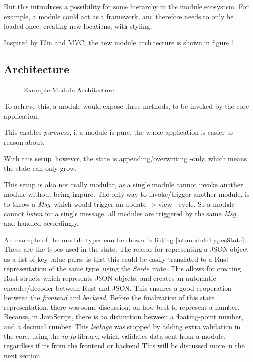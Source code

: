 
But this introduces a possibility for some hierarchy in the module ecosystem.
For example, a module could act as a framework, and therefore needs to only be
loaded once, creating new locations, with styling.

Inspired by Elm and MVC, the new module architecture is shown in figure
\ref{fig:moduleArchitecture}

\subsection{Architecture}
\begin{figure}
  \centering
  
  \caption{Example Module Architecture}
  \label{fig:moduleArchitecture}
\end{figure}

To achieve this, a module would expose three methods, to be invoked by the core
application.

This enables \textit{pureness}, if a module is pure, the whole application is
easier to reason about.

With this setup, however, the state is appending/overwriting -only, which means
the state can only grow.

This setup is also not really modular, as a single module cannot invoke another
module without being impure. The only way to invoke/trigger another module, is
to throw a \textit{Msg}, which would trigger an update -> view - cycle. So
a module cannot \textit{listen} for a single message, all modules are triggered
by the same \textit{Msg}, and handled accordingly.

An example of the module types can be shown in listing
\ref{lst:moduleTypesState}. These are the types used in the state. The reason
for representing a JSON object as a list of key-value pairs, is that this could
be easily translated to a Rust representation of the same type, using the
\textit{Serde} crate. This allows for creating Rust structs which represents
JSON objects, and creates an automatic encoder/decoder between Rust and JSON.
This ensures a good cooperation between the \textit{frontend} and
\textit{backend}.
Before the finalization of this state representation, there was some
discussion, on how best to represent a number. Because, in JavaScript, there is
no distinction between a floating-point number, and a decimal number. This
\textit{leakage} was stopped by adding extra validation in the core, using the
\textit{io-fp} library, which validates data sent from a module, regardless if
its from the frontend or backend This will be discussed more in the next
section.

